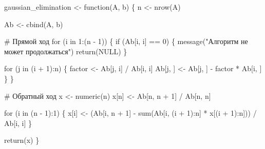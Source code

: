 \documentclass[
  letterpaper,
  DIV=11,
  numbers=noendperiod]{scrartcl}
\newenvironment{Shaded}{\begin{snugshade}}{\end{snugshade}}
\newcommand{\CommentTok}[1]{\textcolor[rgb]{0.37,0.37,0.37}{#1}}
\newcommand{\ConstantTok}[1]{\textcolor[rgb]{0.56,0.35,0.01}{#1}}
\newcommand{\ControlFlowTok}[1]{\textcolor[rgb]{0.00,0.23,0.31}{#1}}
\newcommand{\DecValTok}[1]{\textcolor[rgb]{0.68,0.00,0.00}{#1}}
\newcommand{\FunctionTok}[1]{\textcolor[rgb]{0.28,0.35,0.67}{#1}}
\newcommand{\NormalTok}[1]{\textcolor[rgb]{0.00,0.23,0.31}{#1}}
\newcommand{\OtherTok}[1]{\textcolor[rgb]{0.00,0.23,0.31}{#1}}
\newcommand{\SpecialCharTok}[1]{\textcolor[rgb]{0.37,0.37,0.37}{#1}}
\newcommand{\StringTok}[1]{\textcolor[rgb]{0.13,0.47,0.30}{#1}}
\begin{document}
\begin{Shaded}
\begin{Highlighting}[]
\NormalTok{gaussian\_elimination }\OtherTok{\textless{}{-}} \ControlFlowTok{function}\NormalTok{(A, b) \{}
\NormalTok{  n }\OtherTok{\textless{}{-}} \FunctionTok{nrow}\NormalTok{(A)}
  
\NormalTok{  Ab }\OtherTok{\textless{}{-}} \FunctionTok{cbind}\NormalTok{(A, b)}
  
  \CommentTok{\# Прямой ход}
  \ControlFlowTok{for}\NormalTok{ (i }\ControlFlowTok{in} \DecValTok{1}\SpecialCharTok{:}\NormalTok{(n }\SpecialCharTok{{-}} \DecValTok{1}\NormalTok{)) \{}
    \ControlFlowTok{if}\NormalTok{ (Ab[i, i] }\SpecialCharTok{==} \DecValTok{0}\NormalTok{) \{}
      \FunctionTok{message}\NormalTok{(}\StringTok{"Алгоритм не может продолжаться"}\NormalTok{)}
      \FunctionTok{return}\NormalTok{(}\ConstantTok{NULL}\NormalTok{)}
\NormalTok{    \}}
    
    \ControlFlowTok{for}\NormalTok{ (j }\ControlFlowTok{in}\NormalTok{ (i }\SpecialCharTok{+} \DecValTok{1}\NormalTok{)}\SpecialCharTok{:}\NormalTok{n) \{}
\NormalTok{      factor }\OtherTok{\textless{}{-}}\NormalTok{ Ab[j, i] }\SpecialCharTok{/}\NormalTok{ Ab[i, i]}
\NormalTok{      Ab[j, ] }\OtherTok{\textless{}{-}}\NormalTok{ Ab[j, ] }\SpecialCharTok{{-}}\NormalTok{ factor }\SpecialCharTok{*}\NormalTok{ Ab[i, ]}
\NormalTok{    \}}
\NormalTok{  \}}
  
  \CommentTok{\# Обратный ход}
\NormalTok{  x }\OtherTok{\textless{}{-}} \FunctionTok{numeric}\NormalTok{(n)}
\NormalTok{  x[n] }\OtherTok{\textless{}{-}}\NormalTok{ Ab[n, n }\SpecialCharTok{+} \DecValTok{1}\NormalTok{] }\SpecialCharTok{/}\NormalTok{ Ab[n, n]}
  
  \ControlFlowTok{for}\NormalTok{ (i }\ControlFlowTok{in}\NormalTok{ (n }\SpecialCharTok{{-}} \DecValTok{1}\NormalTok{)}\SpecialCharTok{:}\DecValTok{1}\NormalTok{) \{}
\NormalTok{    x[i] }\OtherTok{\textless{}{-}}\NormalTok{ (Ab[i, n }\SpecialCharTok{+} \DecValTok{1}\NormalTok{] }\SpecialCharTok{{-}} \FunctionTok{sum}\NormalTok{(Ab[i, (i }\SpecialCharTok{+} \DecValTok{1}\NormalTok{)}\SpecialCharTok{:}\NormalTok{n] }\SpecialCharTok{*}\NormalTok{ x[(i }\SpecialCharTok{+} \DecValTok{1}\NormalTok{)}\SpecialCharTok{:}\NormalTok{n])) }\SpecialCharTok{/}\NormalTok{ Ab[i, i]}
\NormalTok{  \}}
  
  \FunctionTok{return}\NormalTok{(x)}
\NormalTok{\}}
\end{Highlighting}
\end{Shaded}
\end{document}
